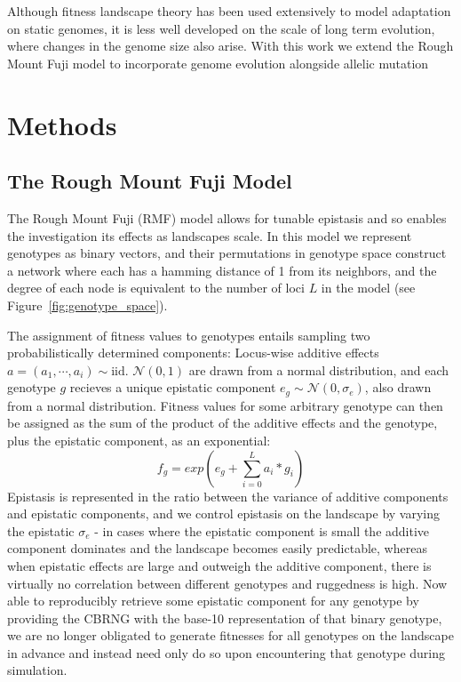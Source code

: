 \documentclass[paper=a4, fontsize=11pt,twoside]{scrartcl}       %
\begin{document}
 
Although fitness landscape theory has been used extensively to model adaptation on static genomes, it is less well developed on the scale of long term evolution, where changes in the genome size also arise. With this work we extend the Rough Mount Fuji model to incorporate genome evolution alongside allelic mutation

\section*{Methods}

\subsection*{The Rough Mount Fuji Model}

The Rough Mount Fuji (RMF) model allows for tunable epistasis \cite{neidhartAdaptationTunablyRugged2014} and so enables the investigation its effects as landscapes scale. In this model we represent genotypes as binary vectors, and their permutations in genotype space construct a network where each has a hamming distance of 1 from its neighbors, and the degree of each node is equivalent to the number of loci $L$ in the model (see Figure~\ref{fig:genotype_space}).

The assignment of fitness values to genotypes entails sampling two probabilistically determined components: Locus-wise additive effects $a = (a_1, \cdots, a_i) \sim \text{iid. } \mathcal{N}(0, 1)$ are drawn from a normal distribution, and each genotype $g$ recieves a unique epistatic component $e_g \sim \mathcal{N}(0, \sigma_e)$, also drawn from a normal distribution.  Fitness values for some arbitrary genotype can then be assigned as the sum of the product of the additive effects and the genotype, plus the epistatic component, as an exponential: $$f_g = exp{(e_g + \sum_{i=0}^{L} a_i * g_i)}$$ Epistasis is represented in the ratio between the variance of additive components and epistatic components, and we control epistasis on the landscape by varying the epistatic $\sigma_e$ - in cases where the epistatic component is small the additive component dominates and the landscape becomes easily predictable, whereas when epistatic effects are large and outweigh the additive component, there is virtually no correlation between different genotypes and ruggedness is high. Now able to reproducibly retrieve some epistatic component for any genotype by providing the CBRNG with the base-10 representation of that binary genotype, we are no longer obligated to generate fitnesses for all genotypes on the landscape in advance and instead need only do so upon encountering that genotype during simulation.
\end{document}
